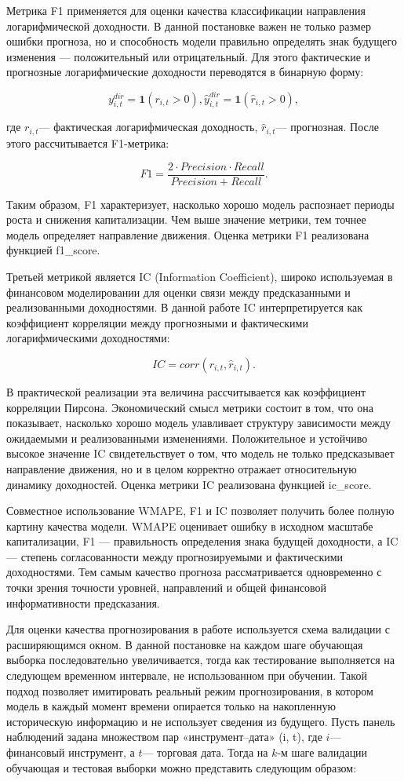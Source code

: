\documentclass[
]{article}
\begin{document}
Метрика F1 применяется для оценки качества классификации направления логарифмической доходности. В данной постановке важен не только размер ошибки прогноза, но и способность модели правильно определять знак будущего изменения --- положительный или отрицательный. Для этого фактические и прогнозные логарифмические доходности переводятся в бинарную форму:

\[y_{i,t}^{dir} = \mathbf{1}(r_{i,t} > 0),{\widehat{y}}_{i,t}^{dir} = \mathbf{1}({\widehat{r}}_{i,t} > 0),
\]

где \(r_{i,t}\)--- фактическая логарифмическая доходность, \({\widehat{r}}_{i,t}\)--- прогнозная. После этого рассчитывается F1-метрика:

\[F1 = \frac{2 \cdot Precision \cdot Recall}{Precision + Recall}.\]

Таким образом, F1 характеризует, насколько хорошо модель распознает периоды роста и снижения капитализации. Чем выше значение метрики, тем точнее модель определяет направление движения. Оценка метрики F1 реализована функцией f1\_score.

Третьей метрикой является IC (Information Coefficient), широко используемая в финансовом моделировании для оценки связи между предсказанными и реализованными доходностями. В данной работе IC интерпретируется как коэффициент корреляции между прогнозными и фактическими логарифмическими доходностями:

\[IC = corr(r_{i,t},{\widehat{r}}_{i,t}).\]

В практической реализации эта величина рассчитывается как коэффициент корреляции Пирсона. Экономический смысл метрики состоит в том, что она показывает, насколько хорошо модель улавливает структуру зависимости между ожидаемыми и реализованными изменениями. Положительное и устойчиво высокое значение IC свидетельствует о том, что модель не только предсказывает направление движения, но и в целом корректно отражает относительную динамику доходностей. Оценка метрики IC реализована функцией ic\_score.

Совместное использование WMAPE, F1 и IC позволяет получить более полную картину качества модели. WMAPE оценивает ошибку в исходном масштабе капитализации, F1 --- правильность определения знака будущей доходности, а IC --- степень согласованности между прогнозируемыми и фактическими доходностями. Тем самым качество прогноза рассматривается одновременно с точки зрения точности уровней, направлений и общей финансовой информативности предсказания.

Для оценки качества прогнозирования в работе используется схема валидации с расширяющимся окном. В данной постановке на каждом шаге обучающая выборка последовательно увеличивается, тогда как тестирование выполняется на следующем временном интервале, не использованном при обучении. Такой подход позволяет имитировать реальный режим прогнозирования, в котором модель в каждый момент времени опирается только на накопленную историческую информацию и не использует сведения из будущего. Пусть панель наблюдений задана множеством пар «инструмент--дата» (i, t), где \(i\)--- финансовый инструмент, а \(t\)--- торговая дата. Тогда на \(k\)-м шаге валидации обучающая и тестовая выборки можно представить следующим образом:
\end{document}
